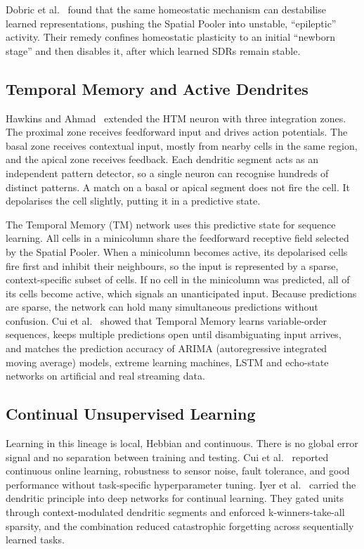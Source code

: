 Dobric et al.~\cite{dobric2021homeostatic,dobric2022newborn} found that the
same homeostatic mechanism can destabilise learned representations, pushing the
Spatial Pooler into unstable, ``epileptic'' activity. Their remedy confines
homeostatic plasticity to an initial ``newborn stage'' and then disables it,
after which learned SDRs remain stable.

\subsection{Temporal Memory and Active Dendrites}
\label{subsec:comp-tm}

Hawkins and Ahmad~\cite{hawkins2016neurons} extended the HTM neuron with three
integration zones. The proximal zone receives feedforward input and drives
action potentials. The basal zone receives contextual input, mostly from
nearby cells in the same region, and the apical zone receives feedback. Each
dendritic segment acts as an independent pattern detector, so a single neuron
can recognise hundreds of distinct patterns. A match on a basal or apical
segment does not fire the cell. It depolarises the cell slightly, putting it
in a predictive state.

The Temporal Memory (TM) network uses this predictive state for sequence
learning. All cells in a minicolumn share the feedforward receptive field
selected by the Spatial Pooler. When a minicolumn becomes active, its
depolarised cells fire first and inhibit their neighbours, so the input is
represented by a sparse, context-specific subset of cells. If no cell in the
minicolumn was predicted, all of its cells become active, which signals an
unanticipated input. Because predictions are sparse, the network can hold many
simultaneous predictions without confusion. Cui et al.~\cite{cui2016sequence}
showed that Temporal Memory learns variable-order sequences, keeps multiple
predictions open until disambiguating input arrives, and matches the prediction
accuracy of ARIMA (autoregressive integrated moving average) models, extreme
learning machines, LSTM and echo-state networks on artificial and real
streaming data.

\subsection{Continual Unsupervised Learning}
\label{subsec:comp-continual}

Learning in this lineage is local, Hebbian and continuous. There is no global
error signal and no separation between training and testing. Cui et
al.~\cite{cui2016sequence} reported continuous online learning, robustness to
sensor noise, fault tolerance, and good performance without task-specific
hyperparameter tuning. Iyer et al.~\cite{iyer2022dendrites} carried the
dendritic principle into deep networks for continual learning. They gated units
through context-modulated dendritic segments and enforced k-winners-take-all
sparsity, and the combination reduced catastrophic forgetting across
sequentially learned tasks.

